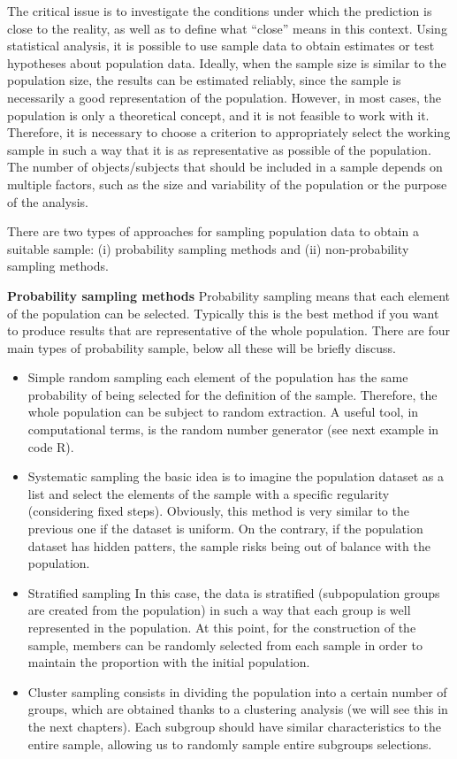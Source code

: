 \documentclass[
  letterpaper,
  DIV=11,
  numbers=noendperiod]{scrreprt}
\begin{document}
The critical issue is to investigate the conditions under which the
prediction is close to the reality, as well as to define what ``close''
means in this context. Using statistical analysis, it is possible to use
sample data to obtain estimates or test hypotheses about population
data. Ideally, when the sample size is similar to the population size,
the results can be estimated reliably, since the sample is necessarily a
good representation of the population. However, in most cases, the
population is only a theoretical concept, and it is not feasible to work
with it. Therefore, it is necessary to choose a criterion to
appropriately select the working sample in such a way that it is as
representative as possible of the population. The number of
objects/subjects that should be included in a sample depends on multiple
factors, such as the size and variability of the population or the
purpose of the analysis.

There are two types of approaches for sampling population data to obtain
a suitable sample: (i) probability sampling methods and (ii)
non-probability sampling methods.

\textbf{Probability sampling methods} Probability sampling means that
each element of the population can be selected. Typically this is the
best method if you want to produce results that are representative of
the whole population. There are four main types of probability sample,
below all these will be briefly discuss.

\begin{itemize}
\item
  Simple random sampling each element of the population has the same
  probability of being selected for the definition of the sample.
  Therefore, the whole population can be subject to random extraction. A
  useful tool, in computational terms, is the random number generator
  (see next example in code R).
\item
  Systematic sampling the basic idea is to imagine the population
  dataset as a list and select the elements of the sample with a
  specific regularity (considering fixed steps). Obviously, this method
  is very similar to the previous one if the dataset is uniform. On the
  contrary, if the population dataset has hidden patters, the sample
  risks being out of balance with the population.
\item
  Stratified sampling In this case, the data is stratified
  (subpopulation groups are created from the population) in such a way
  that each group is well represented in the population. At this point,
  for the construction of the sample, members can be randomly selected
  from each sample in order to maintain the proportion with the initial
  population.
\item
  Cluster sampling consists in dividing the population into a certain
  number of groups, which are obtained thanks to a clustering analysis
  (we will see this in the next chapters). Each subgroup should have
  similar characteristics to the entire sample, allowing us to randomly
  sample entire subgroups selections.
\end{itemize}
\end{document}
